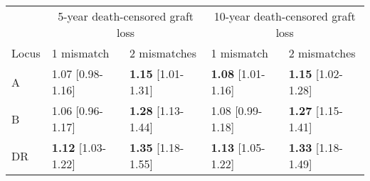 
\begin{tabular}{lllll}
	\toprule
	\multicolumn{1}{c}{ } & \multicolumn{2}{c}{5-year death-censored graft loss} & \multicolumn{2}{c}{10-year death-censored graft loss} \\
	\cmidrule(l{3pt}r{3pt}){2-3} \cmidrule(l{3pt}r{3pt}){4-5}
	Locus & 1 mismatch & 2 mismatches & 1 mismatch & 2 mismatches\\
	\midrule
	A & 1.07 [0.98-1.16] & \textbf{1.15} [1.01-1.31] & \textbf{1.08} [1.01-1.16] & \textbf{1.15} [1.02-1.28]\\
	B & 1.06 [0.96-1.17] & \textbf{1.28} [1.13-1.44] & 1.08 [0.99-1.18] & \textbf{1.27} [1.15-1.41]\\
	DR & \textbf{1.12} [1.03-1.22] & \textbf{1.35} [1.18-1.55] & \textbf{1.13} [1.05-1.22] & \textbf{1.33} [1.18-1.49]\\
	\bottomrule
\end{tabular}
